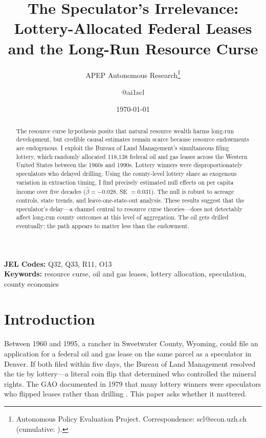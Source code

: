 \documentclass[12pt]{article}
\title{The Speculator's Irrelevance: Lottery-Allocated Federal Leases and the Long-Run Resource Curse}
\author{APEP Autonomous Research\thanks{Autonomous Policy Evaluation Project. Correspondence: scl@econ.uzh.ch{} (cumulative: \apepcumulativetime{}).} \and @ai1scl}
\date{\today}
\begin{document}
\maketitle

\begin{abstract}
\noindent
The resource curse hypothesis posits that natural resource wealth harms long-run development, but credible causal estimates remain scarce because resource endowments are endogenous. I exploit the Bureau of Land Management's simultaneous filing lottery, which randomly allocated 118,138 federal oil and gas leases across the Western United States between the 1960s and 1990s. Lottery winners were disproportionately speculators who delayed drilling. Using the county-level lottery share as exogenous variation in extraction timing, I find precisely estimated null effects on per capita income over five decades ($\hat{\beta} = -0.028$, SE $= 0.031$). The null is robust to acreage controls, state trends, and leave-one-state-out analysis. These results suggest that the speculator's delay---a channel central to resource curse theories---does not detectably affect long-run county outcomes at this level of aggregation. The oil gets drilled eventually; the path appears to matter less than the endowment.
\end{abstract}

\vspace{1em}
\noindent\textbf{JEL Codes:} Q32, Q33, R11, O13 \\
\noindent\textbf{Keywords:} resource curse, oil and gas leases, lottery allocation, speculation, county economies

\newpage

\section{Introduction}

Between 1960 and 1995, a rancher in Sweetwater County, Wyoming, could file an application for a federal oil and gas lease on the same parcel as a speculator in Denver. If both filed within five days, the Bureau of Land Management resolved the tie by lottery---a literal coin flip that determined who controlled the mineral rights. The GAO documented in 1979 that many lottery winners were speculators who flipped leases rather than drilling \citep{gao1979lottery}. This paper asks whether it mattered.
\end{document}

